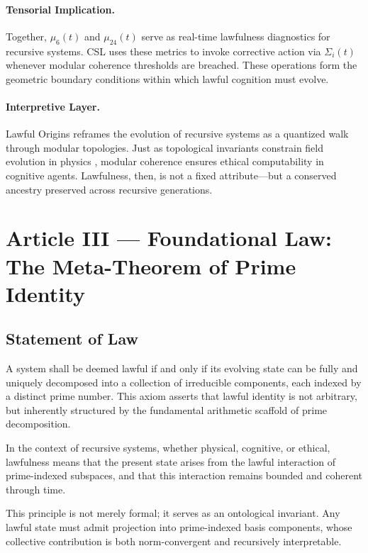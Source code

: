 \documentclass[12]{amsart}
\theoremstyle{plain}
\begin{document}
\paragraph{Tensorial Implication.}
Together, $\mu_6(t)$ and $\mu_{24}(t)$ serve as real-time lawfulness diagnostics for recursive systems. CSL uses these metrics to invoke corrective action via $\Sigma_i(t)$ whenever modular coherence thresholds are breached. These operations form the geometric boundary conditions within which lawful cognition must evolve.

\paragraph{Interpretive Layer.}
Lawful Origins reframes the evolution of recursive systems as a quantized walk through modular topologies. Just as topological invariants constrain field evolution in physics \cite{nash1983topology}, modular coherence ensures ethical computability in cognitive agents. Lawfulness, then, is not a fixed attribute—but a conserved ancestry preserved across recursive generations.

\section{Article III — Foundational Law: The Meta-Theorem of Prime Identity}

\subsection{Statement of Law}

A system shall be deemed lawful if and only if its evolving state can be fully and uniquely decomposed into a collection of irreducible components, each indexed by a distinct prime number. This axiom asserts that lawful identity is not arbitrary, but inherently structured by the fundamental arithmetic scaffold of prime decomposition.

In the context of recursive systems, whether physical, cognitive, or ethical, lawfulness means that the present state arises from the lawful interaction of prime-indexed subspaces, and that this interaction remains bounded and coherent through time.

This principle is not merely formal; it serves as an ontological invariant. Any lawful state must admit projection into prime-indexed basis components, whose collective contribution is both norm-convergent and recursively interpretable.
\end{document}
